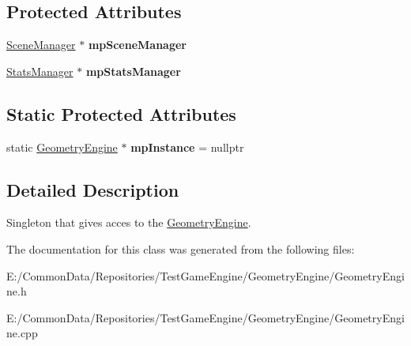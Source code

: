 \subsection*{Protected Attributes}
\begin{DoxyCompactItemize}
\item 
\mbox{\label{class_geometry_engine_1_1_geometry_engine_a6cd62e22c42522ad7c49f50d8d383ca3}} 
\mbox{\hyperlink{class_geometry_engine_1_1_scene_manager}{Scene\+Manager}} $\ast$ {\bfseries mp\+Scene\+Manager}
\item 
\mbox{\label{class_geometry_engine_1_1_geometry_engine_a8346c03b0c0002089050bfb76cf29d8f}} 
\mbox{\hyperlink{class_geometry_engine_1_1_stats_manager}{Stats\+Manager}} $\ast$ {\bfseries mp\+Stats\+Manager}
\end{DoxyCompactItemize}
\subsection*{Static Protected Attributes}
\begin{DoxyCompactItemize}
\item 
\mbox{\label{class_geometry_engine_1_1_geometry_engine_a313d47008b8ce30f251eb50d44cf1830}} 
static \mbox{\hyperlink{class_geometry_engine_1_1_geometry_engine}{Geometry\+Engine}} $\ast$ {\bfseries mp\+Instance} = nullptr
\end{DoxyCompactItemize}


\subsection{Detailed Description}
Singleton that gives acces to the \mbox{\hyperlink{class_geometry_engine_1_1_geometry_engine}{Geometry\+Engine}}. 

The documentation for this class was generated from the following files\+:\begin{DoxyCompactItemize}
\item 
E\+:/\+Common\+Data/\+Repositories/\+Test\+Game\+Engine/\+Geometry\+Engine/Geometry\+Engine.\+h\item 
E\+:/\+Common\+Data/\+Repositories/\+Test\+Game\+Engine/\+Geometry\+Engine/Geometry\+Engine.\+cpp\end{DoxyCompactItemize}
